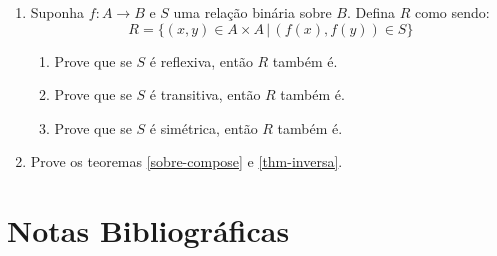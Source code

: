 \begin{enumerate}
\begin{itemize}
      $f(c) = (f\,\uparrow\,C)(c)$.
    \item Prove que se $f$ \'e injetora, ent\~ao $f\,\uparrow\,C$ tamb\'em
      \'e.
    \item Prove que se $f$ \'e sobretora, ent\~ao $f\,\uparrow\,C$ tamb\'em
      \'e.
   \end{itemize}
  \item Suponha $f : A \to B$ e $S$ uma rela\c{c}\~ao bin\'aria sobre
    $B$. Defina $R$ como sendo:
    \[
    R = \{(x,y)\in A \times A\,|\, (f(x),f(y)) \in S\}
    \]
    \begin{enumerate}
      \item Prove que se $S$ \'e reflexiva, ent\~ao $R$ tamb\'em \'e.
      \item Prove que se $S$ \'e transitiva, ent\~ao $R$ tamb\'em \'e.
      \item Prove que se $S$ \'e sim\'etrica, ent\~ao $R$ tamb\'em \'e.
    \end{enumerate}

  \item Prove os teoremas \ref{sobre-compose} e \ref{thm-inversa}.
\end{enumerate}

\section{Notas Bibliográficas}